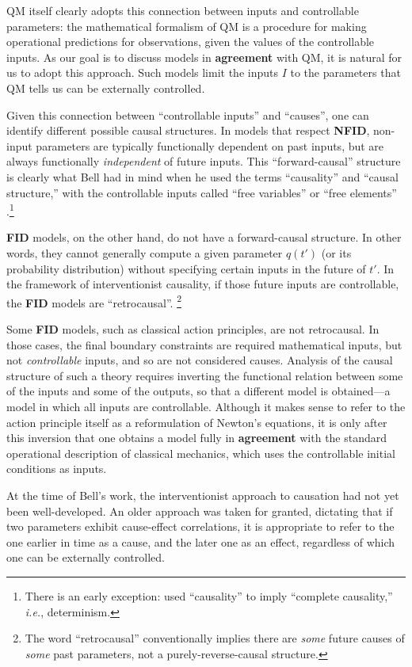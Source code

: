\documentclass[onecolumn, nofootinbib, 12pt]{revtex4-1}
\begin{document}
QM itself clearly adopts this connection between inputs and controllable parameters: the mathematical formalism of QM is a procedure for making operational predictions for observations, given the values of the controllable inputs.  As our goal is to discuss models in {\bf agreement} with QM, it is natural for us to adopt this approach.  Such models limit the inputs $I$ to the parameters that QM tells us can be externally controlled. 

Given this connection between ``controllable inputs'' and ``causes'', one can identify different possible causal structures.  In models that respect {\bf NFID}, non-input parameters are typically functionally dependent on past inputs, but are always functionally \textit{independent} of future inputs. This ``forward-causal'' structure is clearly what Bell had in mind when he used the terms ``causality'' and ``causal structure,'' with the controllable inputs called ``free variables'' or ``free elements'' \cite{bell1977,bell1990}.\footnote{
There is an early exception: \textcite{bell1964} used ``causality'' to imply ``complete causality,'' \emph{i.e.}, determinism.}

{\bf FID} models, on the other hand, do not have a forward-causal structure.  In other words, they cannot generally compute a given parameter $q(t')$ (or its probability distribution) without specifying certain inputs in the future of $t'$.  In the framework of interventionist causality, if those future inputs are controllable, the {\bf FID} models are ``retrocausal''.%
\footnote{The word ``retrocausal'' conventionally implies there are \textit{some} future causes of \textit{some} past parameters, not a purely-reverse-causal structure.}

Some {\bf FID} models, such as classical action principles, are not retrocausal.  In those cases, the final boundary constraints are required mathematical inputs, but not {\em controllable} inputs, and so are not considered causes.  Analysis of the causal structure of such a theory requires inverting the functional relation between some of the inputs and some of the outputs, so that a different model is obtained---a model in which all inputs are controllable.  Although it makes sense to refer to the action principle itself as a reformulation of Newton's equations, it is only after this inversion that one obtains a model fully in {\bf agreement} with the standard operational description of classical mechanics, which uses the controllable initial conditions as inputs.

At the time of Bell's work, the interventionist approach to causation had not yet been well-developed.  An older approach was taken for granted, dictating that if two parameters exhibit cause-effect correlations, it is appropriate to refer to the one earlier in time as a cause, and the later one as an effect, regardless of which one can be externally controlled.
\end{document}
